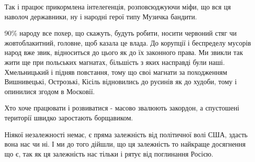 Так і працює прикормлена інтелегенція, розповсюджуючи міфи, що вся ця наволоч
державники, ну і народні герої типу Музичка бандити.  

90\% народу все похер, що скажуть, будуть робити, носити червоний стяг чи
жовтоблакитний, головне, щоб казала це влада. До корупції  і беспределу мусорів
народ вже звик, відноситься до цього як до їх законного права. Ми звикли так
жити ще при польських магнатах, більшість з яких насправді були наші.
Хмельницький і підняв повстання, тому що своі магнати за походженням
Вишнивецькі, Острозькі, Кісіль відновились до русинів як до худоби, тому і
опинилися згодом в Московії. 

Хто хоче працювати і розвиватися  - масово звалюють закордон, а спустошені
території швидко заростають борщавиком. 

Ніякої незалежності немає, є пряма залежність від політичної волі США, здасть
вона нас чи ні. І ми до того дійшли, що ця залежність то найкраще досягнення що
є, так як ця залежність нас тільки і рятує від поглинання Росією.
